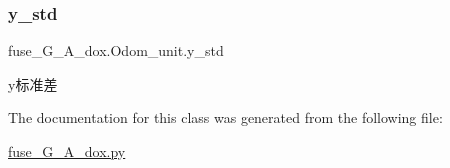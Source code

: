 \subsubsection{\texorpdfstring{y\+\_\+std}{y\_std}}
{\footnotesize\ttfamily fuse\+\_\+\+G\+\_\+\+A\+\_\+dox.\+Odom\+\_\+unit.\+y\+\_\+std}



y标准差 



The documentation for this class was generated from the following file\+:\begin{DoxyCompactItemize}
\item 
\hyperlink{fuse___g___a__dox_8py}{fuse\+\_\+\+G\+\_\+\+A\+\_\+dox.\+py}\end{DoxyCompactItemize}
